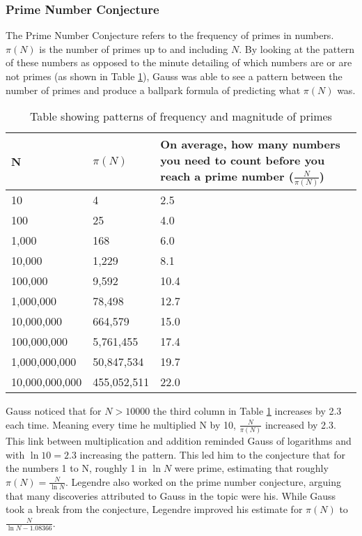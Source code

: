 \documentclass{article}
\begin{document}
\subsubsection{Prime Number Conjecture}
The Prime Number Conjecture refers to the frequency of primes in numbers. $ \pi (N)$ is the number of primes up to and including $N$\cite{musicofprimes}. By looking at the pattern of these numbers as opposed to the minute detailing of which numbers are or are not primes (as shown in Table \ref{table:1}), Gauss was able to see a pattern between the number of primes and produce a ballpark formula of predicting what $ \pi (N)$ was\cite{musicofprimes}. 
\begin{table}[h!]
\begin{center}
\begin{tabular}{ |m{13em}|m{13em}|m{14em}| } 
 \hline
 N & $ \pi (N)$ & On average, how many numbers you need to count before you reach a prime number ($ \frac{N}{ \pi (N)}$) \\
 \hline
 10 & 4 & 2.5 \\
 100 & 25 & 4.0 \\
 1,000 & 168 & 6.0 \\
 10,000 & 1,229 & 8.1 \\
 100,000 & 9,592 & 10.4 \\
 1,000,000 & 78,498 & 12.7 \\
 10,000,000 & 664,579 & 15.0 \\
 100,000,000 & 5,761,455 & 17.4 \\
 1,000,000,000 & 50,847,534 & 19.7 \\
 10,000,000,000 & 455,052,511 & 22.0 \\
 \hline
\end{tabular}
\end{center}
\caption{Table showing patterns of frequency and magnitude of primes}
\label{table:1}
\end{table}

Gauss noticed that for $N > 10000$ the third column in Table \ref{table:1} increases by 2.3 each time. Meaning every time he multiplied N by 10, $ \frac{N}{ \pi (N)}$ increased by 2.3. This link between multiplication and addition reminded Gauss of logarithms and with $\ln{10}=2.3$ increasing the pattern. This led him to the conjecture that for the numbers 1 to N, roughly 1 in $ \ln{N}$ were prime, estimating that roughly $ \pi (N) = \frac{N}{\ln{N}}$\cite{musicofprimes}.
Legendre also worked on the prime number conjecture, arguing that many discoveries attributed to Gauss in the topic were his\cite{musicofprimes}. While Gauss took a break from the conjecture, Legendre improved his estimate for $\pi (N)$ to $\frac{N}{\ln{N} - 1.08366}$.
\end{document}
